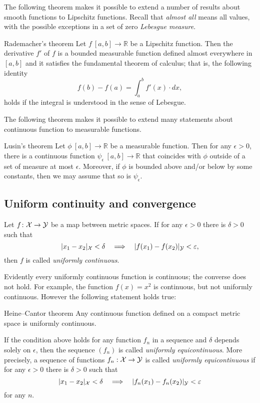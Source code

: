The following theorem makes it possible to extend a number of results about smooth functions to Lipschitz functions.
Recall that {}\emph{almost all} means all values, with the possible exceptions in a set of zero {}\emph{Lebesgue measure}.

\begin{thm}{Rademacher's theorem}\label{thm:rademacher}
Let $f\:[a,b]\to\mathbb{R}$ be a Lipschitz function.
Then the derivative $f'$ of $f$ is a bounded measurable function defined almost everywhere in $[a,b]$ and it satisfies the fundamental theorem of calculus; that is, the following identity 
\[f(b)-f(a)=\int_a^b f'(x)\cdot dx,\]
holds if the integral is understood in the sense of Lebesgue.
\end{thm}

The following theorem makes it possible to extend many statements about continuous function to measurable functions.

\begin{thm}{Lusin's theorem}\label{thm:lusin}
Let $\phi\:[a,b]\to \mathbb{R}$ be a measurable function.
Then for any $\epsilon>0$, there is a continuous function $\psi_\epsilon\:[a,b]\to \mathbb{R}$ that coincides with $\phi$ outside of a set of measure at most $\epsilon$.
Moreover, if $\phi$ is bounded above and/or below by some constants, then we may assume that so is $\psi_\epsilon$.  
\end{thm}

\subsection*{Uniform continuity and convergence}

Let $f\colon{\mathcal{X}}\to \mathcal{Y}$ be a map between metric spaces.
If  for any $\epsilon>0$ there is $\delta>0$ such that 
\[\dist{x_1}{x_2}{\spc{X}}<\delta\quad\Longrightarrow\quad \dist{f(x_1)}{f(x_2)}{\spc{Y}}<\epsilon,\]
then $f$ is called \emph{uniformly continuous}.

Evidently every uniformly continuous function is continuous;
the converse does not hold.
For example, the function $f(x)=x^2$ is continuous, but not uniformly continuous.
However the following statement holds true:

\begin{thm}{Heine--Cantor theorem}
Any continuous function defined on a compact metric space is uniformly continuous.
\end{thm}

If the condition above holds for any function $f_n$ in a sequence and $\delta$ depends solely on $\epsilon$,
then the sequence $(f_n)$ is called \emph{uniformly equicontinuous}.
More precisely, 
a sequence of functions $f_n:{\mathcal{X}}\to \mathcal{Y}$ is called {}\emph{uniformly equicontinuous} if 
for any $\epsilon>0$ there is $\delta>0$ such that 
\[\dist{x_1}{x_2}{\spc{X}}<\delta\quad\Longrightarrow\quad \dist{f_n(x_1)}{f_n(x_2)}{\spc{Y}}<\epsilon\]
for any $n$.


